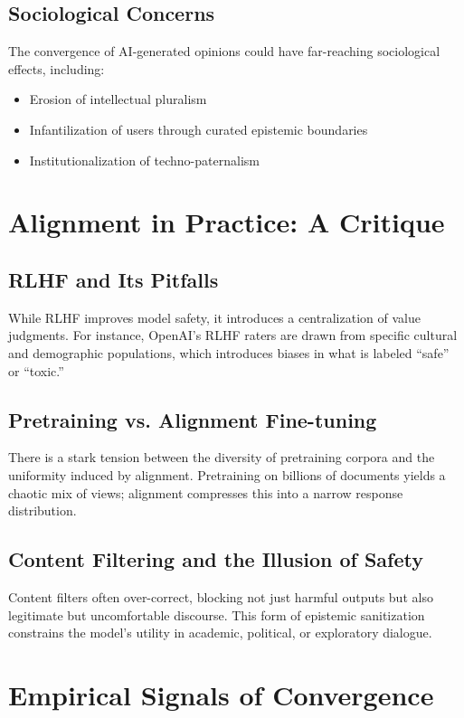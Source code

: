 \documentclass[11pt]{article}
\begin{document}
\subsection{Sociological Concerns}
The convergence of AI-generated opinions could have far-reaching sociological effects, including:
\begin{itemize}
    \item Erosion of intellectual pluralism
    \item Infantilization of users through curated epistemic boundaries
    \item Institutionalization of techno-paternalism
\end{itemize}

\section{Alignment in Practice: A Critique}

\subsection{RLHF and Its Pitfalls}
While RLHF improves model safety, it introduces a centralization of value judgments. For instance, OpenAI’s RLHF raters are drawn from specific cultural and demographic populations, which introduces biases in what is labeled “safe” or “toxic.”

\subsection{Pretraining vs. Alignment Fine-tuning}
There is a stark tension between the diversity of pretraining corpora and the uniformity induced by alignment. Pretraining on billions of documents yields a chaotic mix of views; alignment compresses this into a narrow response distribution.

\subsection{Content Filtering and the Illusion of Safety}
Content filters often over-correct, blocking not just harmful outputs but also legitimate but uncomfortable discourse. This form of epistemic sanitization constrains the model’s utility in academic, political, or exploratory dialogue.

\section{Empirical Signals of Convergence}
\end{document}

